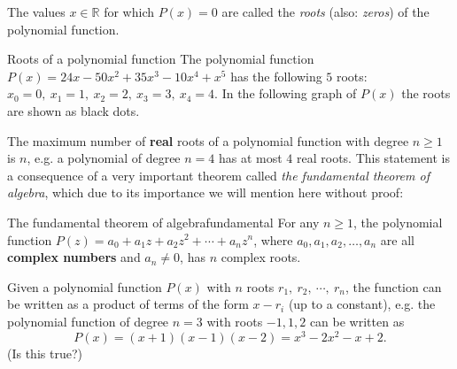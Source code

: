 The values $x\in\mathbb{R}$ for which $P(x)=0$ are called the \emph{roots} (also: \emph{zeros}) of the polynomial function.

\begin{example}{Roots of a polynomial function}{}
	The polynomial function $P(x) = 24x - 50x^{2} + 35x^{3} - 10x^{4} + x^{5}$ has the following $5$ roots: $x_{0}=0,\ x_{1}=1,\ x_{2}=2,\ x_{3}=3,\ x_{4}=4$. In the following graph of $P(x)$ the roots are shown as black dots.
	\begin{figure}[H]
		\centering
	\end{figure}
\end{example}

The maximum number of \textbf{real} roots of a polynomial function with degree $n\geq1$ is $n$, e.g. a polynomial of degree $n=4$ has at most $4$ real roots. This statement is a consequence of a very important theorem called \emph{the fundamental theorem of algebra}, which due to its importance we will mention here without proof:

\begin{theorem}{The fundamental theorem of algebra}{fundamental}
	For any $n\geq1$, the polynomial function $P(z)=a_{0}+a_{1}z+a_{2}z^{2}+\cdots+a_{n}z^{n}$, where $a_{0},a_{1},a_{2},\dots,a_{n}$ are all \textbf{complex numbers} and $a_{n}\neq0$, has $n$ complex roots.
\end{theorem}

Given a polynomial function $P(x)$ with $n$ roots $r_{1},\ r_{2},\ \cdots,\ r_{n}$, the function can be written as a product of terms of the form $x-r_{i}$ (up to a constant), e.g. the polynomial function of degree $n=3$ with roots $-1,1,2$ can be written as
\begin{equation}
	P(x) = (x+1)(x-1)(x-2) = x^{3}-2x^{2}-x+2.
	\label{eq:roots_form}
\end{equation}
(Is this true?)

